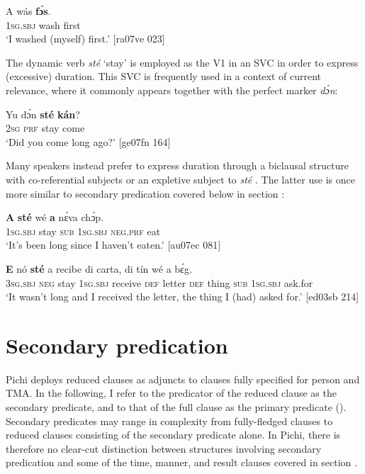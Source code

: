 \ea%
    \label{ex:key:1582}
    \gll A    wás    \textbf{fɔ́s}.\\
\textsc{1sg.sbj}  wash  first\\

\glt ‘I washed (myself) first.’ [ra07ve 023]
\z

The dynamic verb \textit{sté} ‘stay’ is employed as the V1 in an SVC in order to express (excessive) duration. This SVC is frequently used in a context of current relevance, where it commonly appears together with the perfect marker \textit{dɔ́n}: 


\ea%
    \label{ex:key:1583}
    \gll Yu  dɔ́n  \textbf{sté}  \textbf{kán}?\\
\textsc{2sg}  \textsc{prf}  stay  come\\

\glt ‘Did you come long ago?’ [ge07fn 164]
\z

Many speakers instead prefer to express duration through a biclausal structure with co-referential subjects  or an expletive subject to \textit{sté} . The latter use is once more similar to secondary predication covered below in section :


\ea%
    \label{ex:key:1584}
    \gll \textbf{A}    \textbf{sté}  wé  \textbf{a}    nɛ́va  chɔ́p.\\
\textsc{1sg.sbj}  stay  \textsc{sub}  \textsc{1sg.sbj}  \textsc{neg}.\textsc{prf}  eat\\

\glt ‘It’s been long since I haven’t eaten.’ [au07ec 081]
\z


\ea%
    \label{ex:key:1585}
    \gll \textbf{E}    nó \textbf{sté}   a    recibe  di  carta,
di  tín    wé  a    bɛ́g.\\
\textsc{3sg.sbj}  \textsc{neg}  stay    \textsc{1sg.sbj}  receive  \textsc{def}   letter
\textsc{def}  thing  \textsc{sub}  \textsc{1sg.sbj}  ask.for\\

\glt ‘It wasn’t long and I received the letter, the thing I (had) asked for.’ [ed03sb 214]
\z

\section{Secondary predication}\label{sec:11.3}

Pichi deploys reduced clauses as adjuncts to clauses fully specified for person and TMA. In the following, I refer to the predicator of the reduced clause as the secondary predicate, and to that of the full clause as the primary predicate (\citealt{BerndtHimmelmann2004,HimmelmannBerndt2006}). Secondary predicates may range in complexity from fully-fledged clauses to reduced clauses consisting of the secondary predicate alone. In Pichi, there is therefore no clear-cut distinction between structures involving secondary predication and some of the time, manner, and result clauses covered in section .


